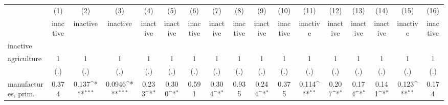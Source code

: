 {
\def\sym#1{\ifmmode^{#1}\else\(^{#1}\)\fi}
\begin{tabular}{l*{16}{c}}
\hline\hline
                    &\multicolumn{1}{c}{(1)}&\multicolumn{1}{c}{(2)}&\multicolumn{1}{c}{(3)}&\multicolumn{1}{c}{(4)}&\multicolumn{1}{c}{(5)}&\multicolumn{1}{c}{(6)}&\multicolumn{1}{c}{(7)}&\multicolumn{1}{c}{(8)}&\multicolumn{1}{c}{(9)}&\multicolumn{1}{c}{(10)}&\multicolumn{1}{c}{(11)}&\multicolumn{1}{c}{(12)}&\multicolumn{1}{c}{(13)}&\multicolumn{1}{c}{(14)}&\multicolumn{1}{c}{(15)}&\multicolumn{1}{c}{(16)}\\
                    &\multicolumn{1}{c}{inactive}&\multicolumn{1}{c}{inactive}&\multicolumn{1}{c}{inactive}&\multicolumn{1}{c}{inactive}&\multicolumn{1}{c}{inactive}&\multicolumn{1}{c}{inactive}&\multicolumn{1}{c}{inactive}&\multicolumn{1}{c}{inactive}&\multicolumn{1}{c}{inactive}&\multicolumn{1}{c}{inactive}&\multicolumn{1}{c}{inactive}&\multicolumn{1}{c}{inactive}&\multicolumn{1}{c}{inactive}&\multicolumn{1}{c}{inactive}&\multicolumn{1}{c}{inactive}&\multicolumn{1}{c}{inactive}\\
\hline
inactive            &                     &                     &                     &                     &                     &                     &                     &                     &                     &                     &                     &                     &                     &                     &                     &                     \\
agriculture         &           1         &           1         &           1         &           1         &           1         &           1         &           1         &           1         &           1         &           1         &           1         &           1         &           1         &           1         &           1         &           1         \\
                    &         (.)         &         (.)         &         (.)         &         (.)         &         (.)         &         (.)         &         (.)         &         (.)         &         (.)         &         (.)         &         (.)         &         (.)         &         (.)         &         (.)         &         (.)         &         (.)         \\
[1em]
manufactures, prim. &       0.374         &       0.137\sym{***}&      0.0946\sym{***}&       0.233\sym{*}  &       0.300\sym{*}  &       0.591         &       0.304\sym{*}  &       0.935         &       0.244\sym{*}  &       0.375         &       0.114\sym{**} &       0.207\sym{*}  &       0.174\sym{*}  &       0.141\sym{*}  &       0.123\sym{**} &       0.174         \\

\end{tabular}}
